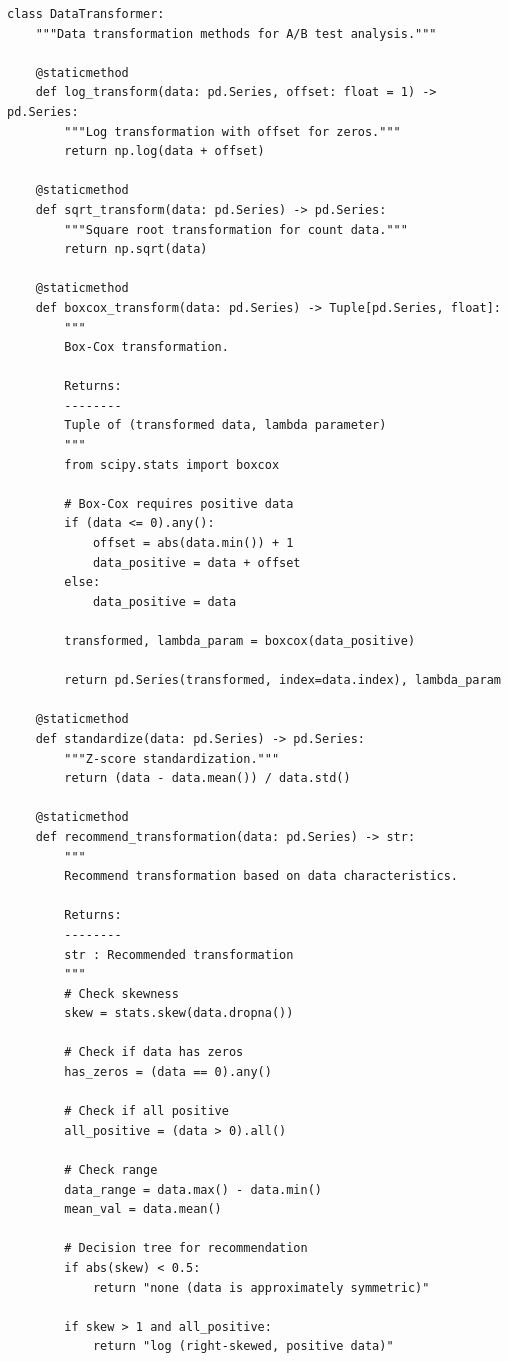 \lstset{language=Python, caption=Data Transformation Functions}
\begin{lstlisting}
class DataTransformer:
    """Data transformation methods for A/B test analysis."""

    @staticmethod
    def log_transform(data: pd.Series, offset: float = 1) -> pd.Series:
        """Log transformation with offset for zeros."""
        return np.log(data + offset)

    @staticmethod
    def sqrt_transform(data: pd.Series) -> pd.Series:
        """Square root transformation for count data."""
        return np.sqrt(data)

    @staticmethod
    def boxcox_transform(data: pd.Series) -> Tuple[pd.Series, float]:
        """
        Box-Cox transformation.

        Returns:
        --------
        Tuple of (transformed data, lambda parameter)
        """
        from scipy.stats import boxcox

        # Box-Cox requires positive data
        if (data <= 0).any():
            offset = abs(data.min()) + 1
            data_positive = data + offset
        else:
            data_positive = data

        transformed, lambda_param = boxcox(data_positive)

        return pd.Series(transformed, index=data.index), lambda_param

    @staticmethod
    def standardize(data: pd.Series) -> pd.Series:
        """Z-score standardization."""
        return (data - data.mean()) / data.std()

    @staticmethod
    def recommend_transformation(data: pd.Series) -> str:
        """
        Recommend transformation based on data characteristics.

        Returns:
        --------
        str : Recommended transformation
        """
        # Check skewness
        skew = stats.skew(data.dropna())

        # Check if data has zeros
        has_zeros = (data == 0).any()

        # Check if all positive
        all_positive = (data > 0).all()

        # Check range
        data_range = data.max() - data.min()
        mean_val = data.mean()

        # Decision tree for recommendation
        if abs(skew) < 0.5:
            return "none (data is approximately symmetric)"

        if skew > 1 and all_positive:
            return "log (right-skewed, positive data)"


\end{lstlisting}
